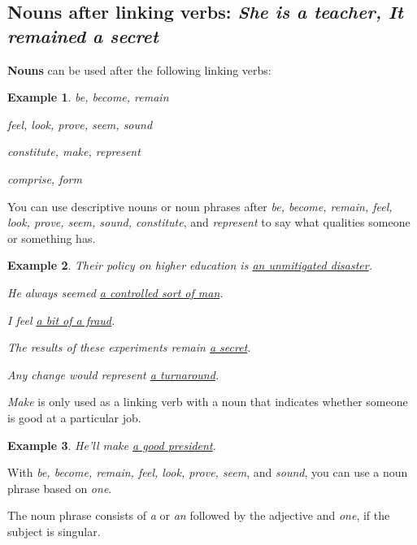 \documentclass[oneside]{book}
\numberwithin{equation}{section}
\newtheorem{example}{Example}[section]
\begin{document}
\subsection{Nouns after linking verbs: \textit{She is a teacher, It remained a secret}}
\noindent{} \textbf{Nouns} can be used after the following linking verbs:
\begin{example}
    be, become, remain
    
    feel, look, prove, seem, sound
    
    constitute, make, represent
    
    comprise, form
\end{example}
%
\noindent{} You can use descriptive nouns or noun phrases after \textit{be, become, remain, feel, look, prove, seem, sound, constitute}, and \textit{represent} to say what qualities someone or something has.
\begin{example}
    Their policy on higher education is \underline{an unmitigated disaster}.
    
    He always seemed \underline{a controlled sort of man}.
    
    I feel \underline{a bit of a fraud}.
    
    The results of these experiments remain \underline{a secret}.
    
    Any change would represent \underline{a turnaround}.
\end{example}
\textit{Make} is only used as a linking verb with a noun that indicates whether someone is good at a particular job.
\begin{example}
    He'll make \underline{a good president}.
\end{example}
%
\noindent{} With \textit{be, become, remain, feel, look, prove, seem}, and \textit{sound}, you can use a noun phrase based on \textit{one}.

%
The noun phrase consists of \textit{a} or \textit{an} followed by the adjective and \textit{one}, if the subject is singular.
\end{document}
